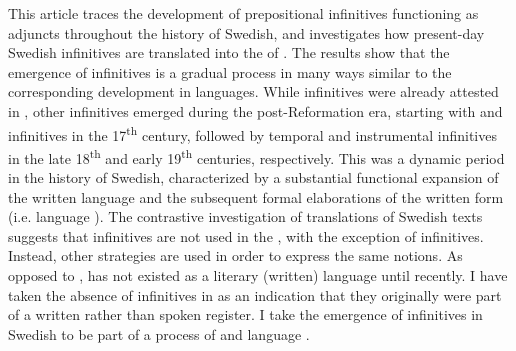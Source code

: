 \documentclass[output=paper]{langscibook}
\begin{document}
This article traces the development of prepositional infinitives functioning as  adjuncts throughout the history of Swedish, and investigates how present-day Swedish  infinitives are translated into the  of . The results show that the emergence of  infinitives is a gradual process in many ways similar to the corresponding development in  languages. While  infinitives were already attested in , other  infinitives emerged during the post-Reformation era, starting with  and  infinitives in the 17\textsuperscript{th} century, followed by temporal and instrumental infinitives in the late 18\textsuperscript{th} and early 19\textsuperscript{th} centuries, respectively. This was a dynamic period in the history of Swedish, characterized by a substantial functional expansion of the written language and the subsequent formal elaborations of the written form (i.e. language ). The contrastive investigation of  translations of Swedish texts suggests that  infinitives are not used in the , with the exception of  infinitives. Instead, other strategies are used in order to express the same  notions. As opposed to ,  has not existed as a literary (written) language until recently. I have taken the absence of  infinitives in  as an indication that they originally were part of a written rather than spoken register. I take the emergence of  infinitives in Swedish to be part of a process of  and language . 
\end{document}
